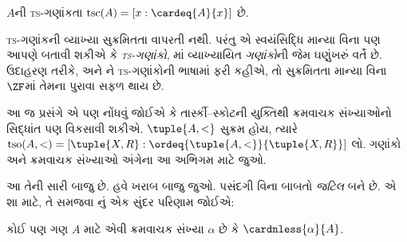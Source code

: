 \begin{defn}
$A$ની \textsc{ts}-ગણાંકતા
$\text{tsc}(A) = [x : \cardeq{A}{x}]$ છે.
\end{defn}

\textsc{ts}-ગણાંકની વ્યાખ્યા સુક્રમિતતા
વાપરતી નથી. પરંતુ એ સ્વયંસિદ્ધિ માન્યા
વિના પણ આપણે બતાવી શકીએ કે
\emph{\textsc{ts}-ગણાંકો},
માં
વ્યાખ્યાયિત \emph{ગણાંકો}ની જેમ ઘણુંખરું
વર્તે છે. ઉદાહરણ તરીકે,
અને ને
\textsc{ts}-ગણાંકોની ભાષામાં ફરી કહીએ, તો
સુક્રમિતતા માન્યા વિના $\ZF$માં તેમના
પુરાવા સફળ થાય છે.

આ જ પ્રસંગે એ પણ નોંધવું જોઈએ કે
તાર્સ્કી--સ્કોટની યુક્તિથી ક્રમવાચક
સંખ્યાઓનો સિદ્ધાંત પણ વિકસાવી શકીએ.
$\tuple{A, <}$ સુક્રમ હોય, ત્યારે
$\text{tso}(A, <) = [\tuple{X,
R} : \ordeq{\tuple{A, <}}{\tuple{X, R}}]$ લો.
ગણાંકો અને ક્રમવાચક સંખ્યાઓ અંગેના આ
અભિગમ માટે \citet[chs.~9--12]{Potter2004} જુઓ.
\endgroup

\begingroup
\makeatletter{}\makeatother

\label{guunit:OLP-0595}


આ તેની સારી બાજુ છે. હવે ખરાબ બાજુ જુઓ.
પસંદગી વિના બાબતો \emph{જટિલ} બને છે.
એ શા માટે, તે સમજવા \cite{Hartogs1915}નું
એક સુંદર પરિણામ જોઈએ:

\begin{lem}[\emph{$\ZF$માં}]
કોઈ પણ ગણ $A$ માટે એવી ક્રમવાચક સંખ્યા
$\alpha$ છે કે $\cardnless{\alpha}{A}$.
\end{lem}

